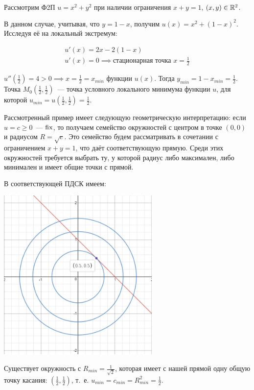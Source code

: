 \documentclass[../../main.tex]{subfiles}
\begin{document}
\begin{example}
	\;
	
	Рассмотрим Ф2П $u = x^2 + y^2$ при наличии ограничения
	$x + y = 1$, $(x, y) \in \mathbb{R}^2$.
	
	В данном случае, учитывая, что $y = 1 - x$, получим
	$u(x) = x^2 + (1-x)^2$. Исследуя её на локальный экстремум:
	
    \[\begin{array}{c}
	u'(x) = 2x - 2(1-x) \\
	u'(x) = 0 \implies \text{стационарная точка }x = \frac{1}{2}
	\end{array}\]
	
	$u''(\frac{1}{2}) = 4 > 0 \implies x = \frac{1}{2} = x_{min}$ функции $u(x)$.
	Тогда $y_{min} = 1 - x_{min} = \frac12$. 
	Точка 
	$M_0( \frac{1}{2}, \frac{1}{2})$~--- точка 
	условного локального минимума функции $u$, для которой 
	$u_{min} = u( \frac{1}{2}, \frac{1}{2} ) = \frac{1}{2}$. 
	
	Рассмотренный пример имеет следующую геометрическую интерпретацию:
	если $u = c \ge 0$~--- $\operatorname{fix}$, то получаем семейство 
	окружностей с центром в точке $(0, 0)$ и радиусом $R = \sqrt{c}$.
	Это семейство будем рассматривать в сочетании с ограничением
	$x + y = 1$, что даёт соответствующую прямую.
	Среди этих окружностей требуется выбрать ту, у которой 
	радиус либо максимален, либо минимален и имеет общие точки с прямой.
	
	В соответствующей ПДСК имеем:
	
	\begin{center}
	\includegraphics[width=0.6\textwidth]{family_of_circles.png}
    \end{center}
	
	Существует окружность с $R_{min} = \frac{1}{ \sqrt{2} }$, 
	которая имеет с нашей прямой одну общую точку касания: 
	$\left( \frac{1}{2}, \frac{1}{2} \right)$, т.~е.
	$u_{min} = c_{min} = R^2_{min} = \frac{1}{2}$.
\end{example}
\end{document}
